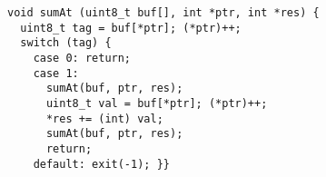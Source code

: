 \begin{lstlisting}
void sumAt (uint8_t buf[], int *ptr, int *res) {
  uint8_t tag = buf[*ptr]; (*ptr)++;
  switch (tag) {
    case 0: return;
    case 1:
      sumAt(buf, ptr, res);
      uint8_t val = buf[*ptr]; (*ptr)++;
      *res += (int) val;
      sumAt(buf, ptr, res);
      return;
    default: exit(-1); }}
\end{lstlisting}

